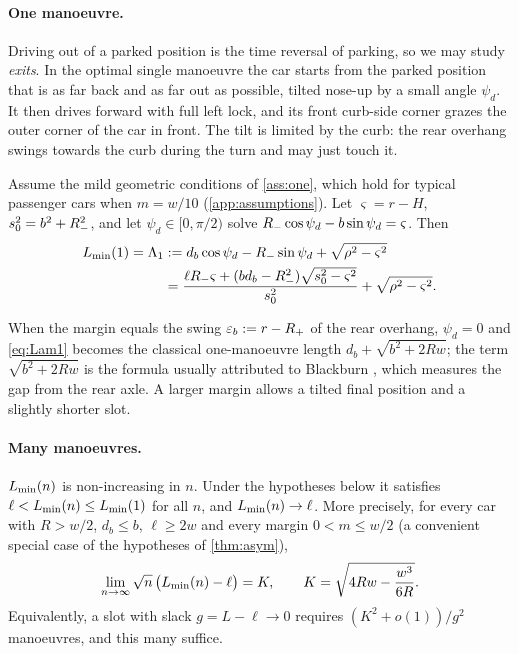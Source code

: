 \paragraph{One manoeuvre.}
Driving out of a parked position is the time reversal of parking, so we may study \emph{exits}.
In the optimal single manoeuvre the car starts from the parked position that is as far back and as far out as possible, tilted nose-up by a small angle $\psi_d$.
It then drives forward with full left lock, and its front curb-side corner grazes the outer corner of the car in front.
The tilt is limited by the curb: the rear overhang swings towards the curb during the turn and may just touch it.

\begin{theorem}\label{thm:intro-one}
Assume the mild geometric conditions of \cref{ass:one}, which hold for typical passenger cars when $m=w/10$ (\cref{app:assumptions}).
Let $\varsigma=r-H$, $s_0^2=b^2+R_{-}^2$, and let $\psi_d\in[0,\pi/2)$ solve $R_{-}\cos\psi_d-b\sin\psi_d=\varsigma$.
Then
\begin{equation}\label{eq:Lam1}
\begin{aligned}
  L_{\min}(1)=\Lambda_1&:=d_b\cos\psi_d-R_{-}\sin\psi_d+\sqrt{\rho^2-\varsigma^2}\\
  &=\frac{\ell R_{-} \varsigma+(bd_b-R_{-}^2)\sqrt{s_0^2-\varsigma^2}}{s_0^2}+\sqrt{\rho^2-\varsigma^2}.
\end{aligned}
\end{equation}
\end{theorem}

When the margin equals the swing $\varepsilon_b:=r-R_{+}$ of the rear overhang, $\psi_d=0$ and \eqref{eq:Lam1} becomes the classical one-manoeuvre length $d_b+\sqrt{b^2+2Rw}$; the term $\sqrt{b^2+2Rw}$ is the formula usually attributed to Blackburn \cite{Blackburn}, which measures the gap from the rear axle.
A larger margin allows a tilted final position and a slightly shorter slot.

\paragraph{Many manoeuvres.}

\begin{theorem}\label{thm:intro-asym}
$L_{\min}(n)$ is non-increasing in $n$. Under the hypotheses below it satisfies $\ell<L_{\min}(n)\le L_{\min}(1)$ for all $n$, and $L_{\min}(n)\to\ell$.
More precisely, for every car with $R>w/2$, $d_b\le b$, $\ell\ge2w$ and every margin $0<m\le w/2$ (a convenient special case of the hypotheses of \cref{thm:asym}),
\[
  \lim_{n\to\infty}\sqrt n\,\big(L_{\min}(n)-\ell\big)=K,\qquad K=\sqrt{4Rw-\frac{w^3}{6R}}.
\]
Equivalently, a slot with slack $g=L-\ell\to0$ requires $(K^2+o(1))/g^2$ manoeuvres, and this many suffice.
\end{theorem}


